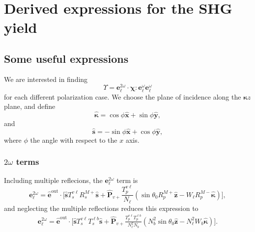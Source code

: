 \chapter{Derived expressions for the SHG yield}
\label{app:sshg_explicit_expressions_rif}


\section{Some useful expressions}
We are interested in finding
\begin{equation*}
\Upsilon = 
\mathbf{e}^{2\omega}_{\ell}\cdot\boldsymbol{\chi}:
\mathbf{e}^{\omega}_{\ell}\mathbf{e}^{\omega}_{\ell}
\end{equation*}
for each different polarization case. We choose the plane of incidence
along the $\boldsymbol{\kappa}z$ plane, and define 
\begin{equation}\label{eqapp:kappavec}
\hat{\boldsymbol{\kappa}}
= \cos\phi\hat{\mathbf{x}} + \sin\phi\hat{\mathbf{y}},
\end{equation}
and
\begin{equation}\label{eqapp:svec}
\hat{\mathbf{s}} = -\sin\phi\hat{\mathbf{x}} + \cos\phi\hat{\mathbf{y}},
\end{equation}
where $\phi$ the angle with respect to the $x$ axis.


\subsection{\texorpdfstring{$2\omega$}{2w} terms}

Including multiple reflecions, the $\mathbf{e}^{2\omega}_{\ell}$ term is
\begin{equation}\label{eqapp:e2wellmr}
\mathbf{e}^{2\omega}_{\ell} = \hat{\mathbf{e}}^{\mathrm{out}}\cdot
\Bigg[
\hat{\mathbf{s}}T_{s}^{v\ell}R^{M+}_{s}\hat{\mathbf{s}} + 
\hat{\mathbf{P}}_{v+}\frac{T^{v\ell}_{p}}{N_{\ell}}
\left(
\sin\theta_{0}R^{M+}_{p}\hat{\mathbf{z}} 
- W_{\ell}R^{M-}_{p}\hat{\boldsymbol{\kappa}}
\right)
\Bigg],
\end{equation}
and neglecting the multiple reflections reduces this expression to
\begin{equation}\label{eqapp:e2well}
\begin{split}
\mathbf{e}^{2\omega}_{\ell} = 
\hat{\mathbf{e}}^{\mathrm{out}}\cdot
\Bigg[
\hat{\mathbf{s}}T_{s}^{v\ell}T_{s}^{\ell b}\hat{\mathbf{s}} + 
\hat{\mathbf{P}}_{v+}
\frac{T^{v\ell}_{p}T^{\ell b}_{p}}
     {N^{2}_{\ell}N_{b}}
\left(
N^{2}_{b}\sin\theta_{0}\hat{\mathbf{z}} - 
N^{2}_{\ell}W_{b}\hat{\boldsymbol{\kappa}}
\right)
\Bigg].
\end{split}
\end{equation}  

